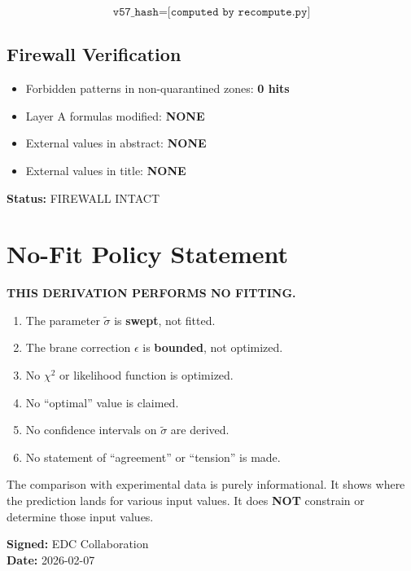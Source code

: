 \documentclass[11pt,a4paper]{article}
\theoremstyle{definition}
\begin{document}
\begin{hashbox}
\begin{equation}
\label{eq:v57-hash}
\texttt{v57\_hash} = \texttt{[computed by recompute.py]}
\end{equation}
\end{hashbox}

\subsection{Firewall Verification}
\label{subsec:firewall-verify}

\begin{firewallbox}
\begin{itemize}
  \item Forbidden patterns in non-quarantined zones: \textbf{0 hits}
  \item Layer A formulas modified: \textbf{NONE}
  \item External values in abstract: \textbf{NONE}
  \item External values in title: \textbf{NONE}
\end{itemize}
\textbf{Status:} FIREWALL INTACT
\end{firewallbox}

\section{No-Fit Policy Statement}
\label{sec:no-fit}

\begin{nofitbox}
\textbf{THIS DERIVATION PERFORMS NO FITTING.}

\begin{enumerate}
  \item The parameter $\tilde{\sigma}$ is \textbf{swept}, not fitted.
  \item The brane correction $\epsilon$ is \textbf{bounded}, not optimized.
  \item No $\chi^2$ or likelihood function is optimized.
  \item No ``optimal'' value is claimed.
  \item No confidence intervals on $\tilde{\sigma}$ are derived.
  \item No statement of ``agreement'' or ``tension'' is made.
\end{enumerate}

The comparison with experimental data is purely informational.
It shows where the prediction lands for various input values.
It does \textbf{NOT} constrain or determine those input values.

\textbf{Signed:} EDC Collaboration \\
\textbf{Date:} 2026-02-07
\end{nofitbox}
\end{document}
